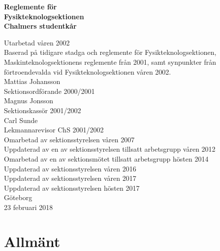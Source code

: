 \documentclass[11pt,a4paper]{article}
\begin{document}

\setlength{\headheight}{14pt}

  \begin{center}
    \textbf{\Huge{Reglemente för}}\\[3mm]
    \textbf{\Huge{Fysikteknologsektionen}}\\
    \vspace{.7 cm}
    \textbf{\Large{Chalmers studentkår}}
    
    
    \vfill
    
    Utarbetad våren 2002\\[5mm]
    Baserad på tidigare stadga och reglemente för Fysikteknologsektionen,
    Maskinteknologsektionens reglemente från 2001, samt synpunkter
    från förtroendevalda vid Fysikteknologsektionen våren 2002.\\[5mm]
    Mattias Johansson\\
    Sektionsordförande 2000/2001\\[5mm]
    Magnus Jonsson\\
    Sektionskassör 2001/2002\\[5mm]
    Carl Sunde\\
    Lekmannarevisor ChS 2001/2002\\[5mm]
    Omarbetad av sektionsstyrelsen våren 2007\\[5mm]
    Uppdaterad av en av sektionsstyrelsen tillsatt arbetsgrupp våren 2012\\[5mm]
    Omarbetad av en av sektionsmötet tillsatt arbetsgrupp hösten 2014 \\[5mm]
    Uppdaterad av sektionsstyrelsen våren 2016 \\
    Uppdaterad av sektionsstyrelsen våren 2017 \\
    Uppdaterad av sektionsstyrelsen hösten 2017 \\
    \vspace{.3 cm}
    \small{Göteborg}\\
    \small{23 februari 2018}
  \end{center}

\clearpage


\tableofcontents

\clearpage


\section{Allmänt}
\end{document}
